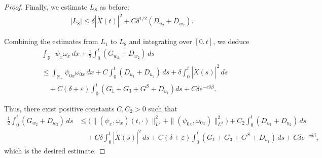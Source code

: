 \documentclass[11pt,reqno]{amsart}
\numberwithin{equation}{section} %
\newcommand{\R}{\mathbb{R}}
\newcommand{\e}{\varepsilon}
\begin{document}
\begin{proof}
Finally, we estimate $L_8$ as before:
\begin{equation*}
\begin{aligned}
|L_8| \le \delta |\dot{X}(t)|^2 + C \delta^{1/2} (D_{u_2} + D_{w_2} ).
\end{aligned}
\end{equation*}

Combining the estimates from $L_1$ to $L_8$ and integrating over $[0,t]$, we deduce
\begin{equation*}
\begin{aligned}
&\int_{\mathbb{R}_+} \psi_x \omega_x \,dx + \frac{1}{2}\int_0^t (G_{w_2}+D_{w_2}) \,ds \\
&\le  \int_{\R_+}\psi_{0x}\omega_{0x}\,dx  + C \int_0^t (D_{u_1}+D_{u_2}) \, ds + \delta \int_0^t |\dot{X}(s)|^2 \,ds \\
&\quad + C(\delta+\varepsilon) \int_0^t \left( G_1 + G_3 + G^S  + D_{u_1} \right) ds + C \delta e^{-c\delta \beta}.
\end{aligned}
\end{equation*}


Thus, there exist positive constants $C, C_2 > 0$ such that
\begin{align*}
	\frac{1}{2}\int_0^t(G_{w_2}+D_{w_2})\,ds &\le \bigl(\|(\psi_x,\omega_x)(t,\cdot)\|_{L^2}^2+\|(\psi_{0x},\omega_{0x})\|_{L^2}^2 \bigr) +C_2\int_0^t(D_{u_1}+D_{u_2})\,ds\\
	&\quad+C\delta\int_0^t|\dot{X}(s)|^2\,ds +C(\delta+\e)\int_0^t(G_1+G_3+G^S+D_{u_1})\,ds +C\delta e^{-c\delta \beta},
\end{align*}
which is the desired estimate.

\end{proof}


\end{document}
